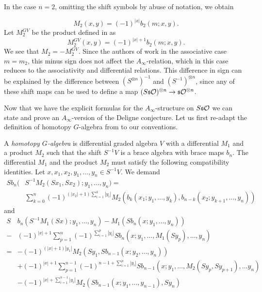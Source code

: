 \documentclass[Thesis.tex]{subfiles}
\begin{document}
\begin{remark}
In the case $n=2$, omitting the shift symbols by abuse of notation, we obtain 

\[M_2(x,y)=(-1)^{|x|}b_2(m;x,y).\]
Let $M^{GV}_2$ be the product defined in \cite{GV} as \[M^{GV}_2(x,y)=(-1)^{|x|+1}b_2(m;x,y).\] We see that $M_2=-M^{GV}_2$. Since the authors of \cite{GV} work in the associative case $m=m_2$, this minus sign does not affect the $A_\infty$-relation, which in this case reduces to the associativity and differential relations. This difference in sign can be explained by the difference between $(S^{\otimes n})^{-1}$ and $(S^{-1})^{\otimes n}$, since any of these shift maps can be used to define a map $(S\mathfrak{s}{\mathcal O})^{\otimes n}\to \mathfrak{s}{\mathcal O}^{\otimes n}$. 
\end{remark}

Now that we have the explicit formulas for the $A_\infty$-structure on $S\mathfrak{s}{\mathcal O}$ we can state and prove an $A_\infty$-version of the Deligne conjecture. Let us first re-adapt the definition of homotopy $G$-algebra from \cite[Definition 2]{GV} to our conventions.

\begin{defin}\label{homotopygalgebras}
A \emph{homotopy $G$-algebra} is differential graded algebra $V$ with a differential $M_1$ and a product $M_2$ such that the shift $S^{-1}V$ is a brace algebra with brace maps $b_n$. The differential $M_1$ and the product $M_2$ must satisfy the following compatibility identities. Let $x,x_1,x_2,y_1,\dots, y_n\in S^{-1}V$. We demand 
\begin{align*}
Sb_n(&S^{-1}M_2(Sx_1,Sx_2);y_1,\dots, y_n) = \\
&\sum_{k=0}^n (-1)^{(|x_2|+1)\sum_{i=1}^k|y_i|}M_2(b_k(x_1;y_1,\dots, y_k),b_{n-k}(x_2;y_{k+1},\dots, y_n))
\end{align*}
and
\begin{align*}
S&b_n(S^{-1}M_1(Sx);y_1,\dots, y_n)-M_1(Sb_n(x;y_1,\dots,y_n))\\
-&(-1)^{|x|+1}\sum_{p=1}^n(-1)^{\sum_{i=1}^p|y_i|}Sb_n(x;y_1,\dots,M_1(Sy_p),\dots, y_n)\\
=&-(-1)^{(|x|+1)|y_1|}M_2(Sy_1,Sb_{n-1}(x;y_2,\dots, y_n))\\
 &+(-1)^{|x|+1}\sum_{p=1}^{n-1}(-1)^{n-1+\sum_{i=1}^p|y_i|}Sb_{n-1}(x;y_1,\dots,M_2(Sy_p,Sy_{p+1}),\dots y_n)\\
 &-(-1)^{|x|+\sum_{i=1}^{n-1}|y_i|}M_2(Sb_{n-1}(x;y_1,\dots, y_{n-1}),Sy_n)
\end{align*}
\end{defin}
\end{document}
